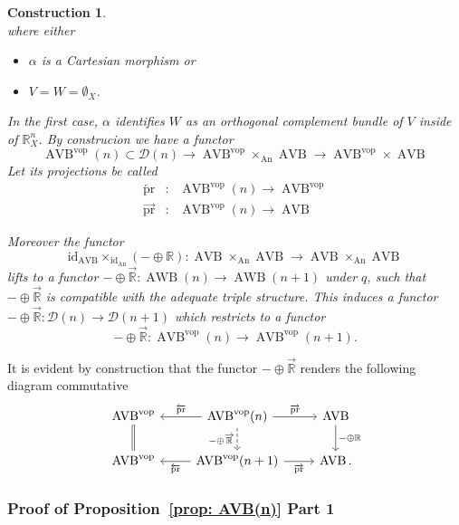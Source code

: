 \documentclass{article}
\newcommand{\R}{\mathbb{R}} %
\newcommand{\cD}{\mathcal{D}}
\newcommand{\vop}{\mathrm{vop}}
\newcommand{\pr}{\mathrm{pr}}
\newcommand{\id}{\mathrm{id}}
\DeclareMathOperator{\AVB}{AVB}
\DeclareMathOperator{\AWB}{AWB}
\DeclareMathOperator{\An}{An}
\newtheorem{construction}{Construction}
\begin{document}
\begin{construction}
\[    \] where either 
    \begin{itemize}
        \item $\alpha$ is a Cartesian morphism or 
        \item $V = W = \emptyset_X$.
    \end{itemize}
    In the first case, $\alpha$ identifies $W$ as an orthogonal complement bundle of $V$ inside of 
    $\R^n_X$.
    By construcion we have a functor 
    \[
        \AVB^\vop(n) \subset \cD(n) \to \AVB^\vop \times_{\An} \AVB  \to \AVB^\vop \times \AVB
    \]
    Let its projections be called 
    \begin{eqnarray*}
        \overleftarrow{\pr} & \colon & \AVB^\vop(n)  \to \AVB^\vop \\
        \overrightarrow{\pr} & \colon & \AVB^\vop(n)  \to  \AVB
    \end{eqnarray*}

    Moreover the functor 
    \[
        \id_{\AVB} \times_{\id_{\An}} (- \oplus \R) \colon \AVB \times_{\An} \AVB \to \AVB \times_{\An} \AVB        
    \]
    lifts to a functor $- \oplus \overrightarrow{\R} \colon \AWB(n) \to \AWB(n + 1)$ under $q$, 
    such that $- \oplus \overrightarrow{\R}$ is compatible with the adequate triple structure. 
    This induces a functor 
    $- \oplus \overrightarrow{\R} \colon \cD(n) \to \cD(n + 1)$ which restricts to a functor 
    \[
        - \oplus \overrightarrow{\R} \colon \AVB^\vop(n) \to \AVB^\vop(n + 1).
    \] 

\end{construction}

    It is evident by construction that the functor $-\oplus \overrightarrow{\R}$
    renders the following diagram commutative 
    \[\begin{tikzcd}
        {\AVB^\vop} & {\AVB^\vop(n)} & \AVB \\
        {\AVB^\vop} & {\AVB^\vop(n + 1)} & \AVB
        \arrow["{ -\oplus\overrightarrow{\R}}"', dashed, from=1-2, to=2-2]
        \arrow["{\overrightarrow{\pr}}", from=1-2, to=1-3]
        \arrow["{\overrightarrow{\pr}}"', from=2-2, to=2-3]
        \arrow["{ - \oplus \R}", from=1-3, to=2-3]
        \arrow["{\overleftarrow{\pr}}"', from=1-2, to=1-1]
        \arrow["{\overleftarrow{\pr}}", from=2-2, to=2-1]
        \arrow[Rightarrow, no head, from=1-1, to=2-1].
    \end{tikzcd}\]

\subsubsection{Proof of Proposition~\ref{prop: AVB(n)} Part 1}
\end{document}
